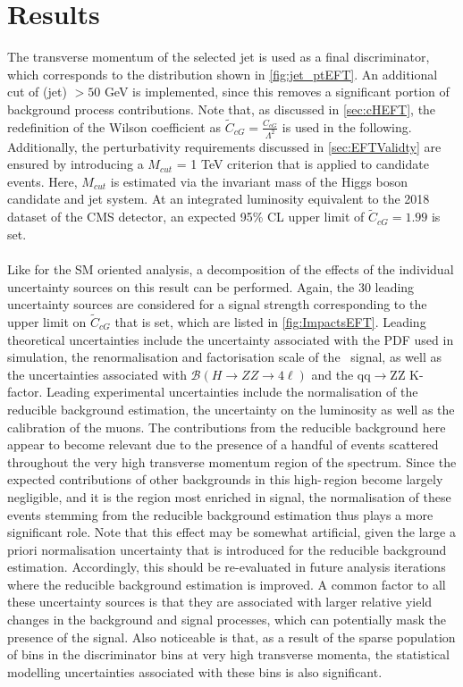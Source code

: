 \section{Results}
\label{EFTResults}
The transverse momentum of the selected jet is used as a final discriminator, which corresponds to the distribution shown in \autoref{fig:jet_ptEFT}. An additional cut of \pt(jet) $>50$ GeV is implemented, since this removes a significant portion of background process contributions. Note that, as discussed in \autoref{sec:cHEFT}, the redefinition of the Wilson coefficient as $\tilde{C}_{cG} = \frac{C_{cG}}{\Lambda^2}$ is used in the following. Additionally, the perturbativity requirements discussed in \autoref{sec:EFTValidty} are ensured by introducing a $M_{cut}$ = 1 TeV criterion that is applied to candidate events. Here, $M_{cut}$ is estimated via the invariant mass of the Higgs boson candidate and jet system. At an integrated luminosity equivalent to the 2018 dataset of the CMS detector, an expected 95\% CL upper limit of $\tilde{C}_{cG} = 1.99$ is set. \\
\\
Like for the SM oriented analysis, a decomposition of the effects of the individual uncertainty sources on this result can be performed. Again, the 30 leading uncertainty sources are considered for a signal strength corresponding to the upper limit on $\tilde{C}_{cG}$ that is set, which are listed in \autoref{fig:ImpactsEFT}. Leading theoretical uncertainties include the uncertainty associated with the PDF used in simulation, the renormalisation and factorisation scale of the \cHZZCMD \, signal, as well as the uncertainties associated with $\mathcal{B}(H \rightarrow ZZ \rightarrow 4\ell)$ and the qq$\rightarrow$ZZ K-factor. Leading experimental uncertainties include the normalisation of the reducible background estimation, the uncertainty on the luminosity as well as the calibration of the muons. The contributions from the reducible background here appear to become relevant due to the presence of a handful of events scattered throughout the very high transverse momentum region of the spectrum. Since the expected contributions of other backgrounds in this high-\pt\,region become largely negligible, and it is the region most enriched in signal, the normalisation of these events stemming from the reducible background estimation thus plays a more significant role. Note that this effect may be somewhat artificial, given the large a priori normalisation uncertainty that is introduced for the reducible background estimation. Accordingly, this should be re-evaluated in future analysis iterations where the reducible background estimation is improved. A common factor to all these uncertainty sources is that they are associated with larger relative yield changes in the background and signal processes, which can potentially mask the presence of the signal. Also noticeable is that, as a result of the sparse population of bins in the discriminator bins at very high transverse momenta, the statistical modelling uncertainties associated with these bins is also significant. \\
